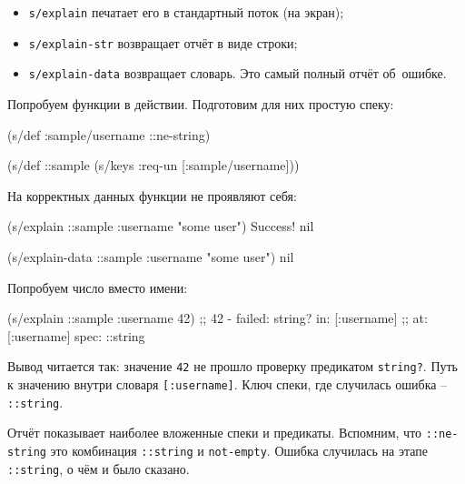 \begin{itemize}


\item
  \verb|s/explain| печатает его в стандартный поток (на экран);

\item
  \verb|s/explain-str| возвращает отчёт в виде строки;

\item
  \verb|s/explain-data| возвращает словарь. Это самый полный отчёт об~ошибке.

\end{itemize}

Попробуем функции в действии. Подготовим для них простую спеку:

\begin{english}
  \begin{clojure}
(s/def :sample/username ::ne-string)

(s/def ::sample
  (s/keys :req-un [:sample/username]))
  \end{clojure}
\end{english}

\noindent
На корректных данных функции не проявляют себя:

\begin{english}
  \begin{clojure}
(s/explain ::sample {:username "some user"})
Success!
nil

(s/explain-data ::sample {:username "some user"})
nil
  \end{clojure}
\end{english}

\noindent
Попробуем число вместо имени:

\begin{english}
  \begin{clojure}
(s/explain ::sample {:username 42})
;; 42 - failed: string? in: [:username]
;; at: [:username] spec: ::string
  \end{clojure}
\end{english}

Вывод читается так: значение \verb|42| не прошло проверку предикатом
\verb|string?|. Путь к значению внутри словаря \verb|[:username]|. Ключ
спеки, где случилась ошибка -- \verb|::string|.

Отчёт показывает наиболее вложенные спеки и предикаты. Вспомним, что
\verb|::ne-string| это комбинация \verb|::string| и
\verb|not-empty|. Ошибка случилась на этапе \verb|::string|, о чём и было
сказано.

